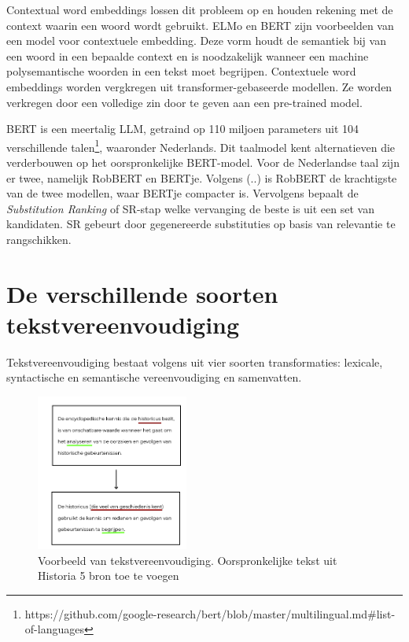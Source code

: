 Contextual word embeddings lossen dit probleem op en houden rekening met de context waarin een woord wordt gebruikt. ELMo en BERT zijn voorbeelden van een model voor contextuele embedding. Deze vorm houdt de semantiek bij van een woord in een bepaalde context en is noodzakelijk wanneer een machine polysemantische woorden in een tekst moet begrijpen. Contextuele word embeddings worden vergkregen uit transformer-gebaseerde modellen. Ze worden verkregen door een volledige zin door te geven aan een pre-trained model.

BERT is een meertalig LLM, getraind op 110 miljoen parameters uit 104 verschillende talen\footnote{https://github.com/google-research/bert/blob/master/multilingual.md#list-of-languages}, waaronder Nederlands. Dit taalmodel kent alternatieven die verderbouwen op het oorspronkelijke BERT-model. Voor de Nederlandse taal zijn er twee, namelijk RobBERT en BERTje. Volgens (..) is RobBERT de krachtigste van de twee modellen, waar BERTje compacter is. Vervolgens bepaalt de \textit{Substitution Ranking} of SR-stap welke vervanging de beste is uit een set van kandidaten. SR gebeurt door gegenereerde substituties op basis van relevantie te rangschikken.

\section{De verschillende soorten tekstvereenvoudiging}

Tekstvereenvoudiging bestaat volgens \textcite{Siddharthan2014} uit vier soorten transformaties: lexicale, syntactische en semantische vereenvoudiging en samenvatten.

\begin{figure}[H]
	\begin{center}
			\includegraphics[width=5cm]{img/voorbeeld-manuele-vereenvoudiging.png}
	\end{center}
	\caption{Voorbeeld van tekstvereenvoudiging. Oorspronkelijke tekst uit Historia 5 bron toe te voegen}
\end{figure}

